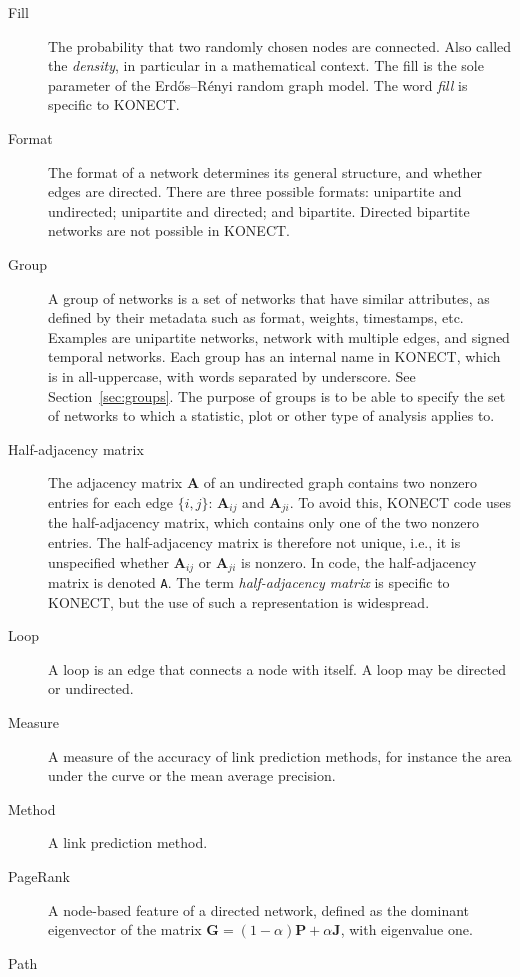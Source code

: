\documentclass{article}
\begin{document}
\begin{description}
  \item[Fill] The probability that two randomly chosen nodes are
    connected.  Also called the \emph{density}, in particular in a
    mathematical context.  The fill is the sole parameter of the
    Erdős--Rényi random graph model.  The word \emph{fill} is specific
    to KONECT. 
  \item[Format] 
    The format of a network determines its general structure, and
    whether edges are directed.  There are three possible formats:
    unipartite and undirected; unipartite and directed; and bipartite.
    Directed bipartite networks are not possible in KONECT.  
  \item[Group]
    A group of networks is a set of networks that have similar
    attributes, as defined by their metadata such as format, weights,
    timestamps, etc.  Examples are unipartite networks, network with
    multiple edges, and signed temporal networks.  Each group has an
    internal name in KONECT, which is in all-uppercase, with words
    separated by underscore.  See Section~\ref{sec:groups}.  The purpose
    of groups is to be able to specify the set of networks to which a
    statistic, plot or other type of analysis applies to.
  \item[Half-adjacency matrix]
    The adjacency matrix $\mathbf A$ of an undirected graph contains two
    nonzero entries for each edge $\{i,j\}$:  $\mathbf A_{ij}$ and
    $\mathbf A_{ji}$.  To avoid this, KONECT code uses the
    half-adjacency matrix, which contains only one of the two nonzero
    entries.  The half-adjacency matrix is therefore not unique, i.e.,
    it is unspecified whether $\mathbf A_{ij}$ or $\mathbf A_{ji}$ is nonzero.  In
    code, the half-adjacency matrix is denoted \texttt{A}.  The term
    \emph{half-adjacency matrix} is specific to KONECT, but the use of
    such a representation is widespread. 
  \item[Loop] 
    A loop is an edge that connects a node with itself.  A loop may be
    directed or undirected.  
  \item[Measure]
    A measure of the accuracy of link prediction methods, for instance
    the area under the curve or the mean average precision.  
  \item[Method]
    A link prediction method. 
  \item[PageRank] 
    A node-based feature of a directed network, defined as the dominant
    eigenvector of the matrix $\mathbf G = (1-\alpha) \mathbf P +
    \alpha\mathbf J$, with eigenvalue one. 
  \item[Path]

\end{description}
\end{document}

